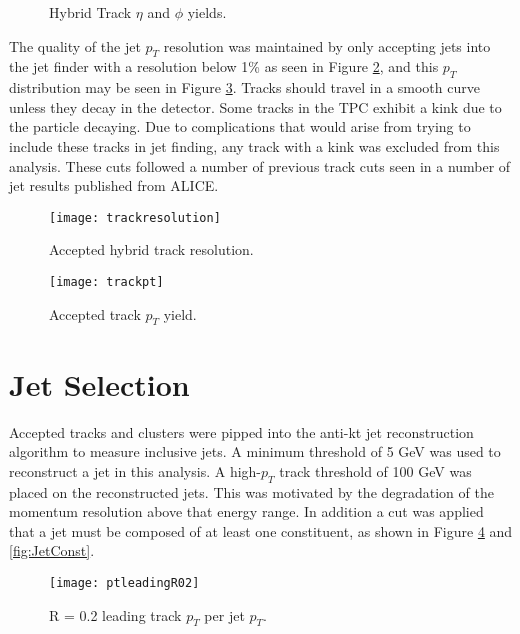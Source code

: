 \begin{figure}%
    \centering
    \qquad
    \caption{Hybrid Track $\eta$ and $\phi$ yields.}%
    \label{fig:Hybridtracketaphi}%
\end{figure}


The quality of the jet $p_{T}$ resolution was maintained by only accepting jets into the jet finder with a resolution below 1\% as seen in Figure \ref{fig:trackresolution}, and this $p_{T}$ distribution may be seen in Figure \ref{fig:hybtrackpt}.  Tracks should travel in a smooth curve unless they decay in the detector.  Some tracks in the TPC exhibit a kink due to the particle decaying.  Due to complications that would arise from trying to include these tracks in jet finding, any track with a kink was excluded from this analysis.  These cuts followed a number of previous track cuts seen in a number of jet results published from ALICE\cite{Acharya:2018eat}.

\begin{figure}[h]
\texttt{[image: trackresolution]}
\centering
\caption{Accepted hybrid track resolution.}
\label{fig:trackresolution}
\end{figure}

\begin{figure}[h]
\texttt{[image: trackpt]}
\centering
\caption{Accepted track $p_{T}$ yield.}
\label{fig:hybtrackpt}
\end{figure}


\section{Jet Selection}

Accepted tracks and clusters were pipped into the anti-kt jet reconstruction algorithm to measure inclusive jets.  A minimum threshold of 5 GeV was used to reconstruct a jet in this analysis.  A high-$p_{T}$ track threshold of 100 GeV was placed on the reconstructed jets.  This was motivated by the degradation of the momentum resolution above that energy range.  In addition a cut was applied that a jet must be composed of at least one constituent, as shown in Figure \ref{fig:JetPt} and \ref{fig:JetConst}.

\begin{figure}[h]
\texttt{[image: ptleadingR02]}
\centering
\caption{R = 0.2 leading track $p_{T}$ per jet $p_{T}$.}
\label{fig:JetPt}
\end{figure}

